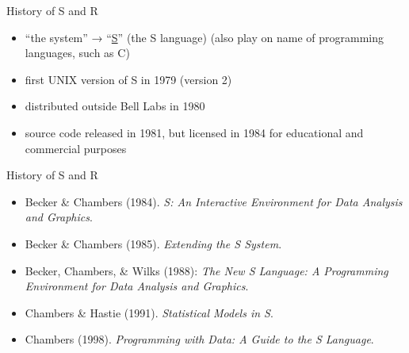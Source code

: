 \documentclass[t,12pt]{beamer}
\begin{document}

\begin{frame}{History of S and R}

\begin{itemize}
   \item ``the system'' → ``\href{http://en.wikipedia.org/wiki/S_(programming_language)}{S}'' (the S language) (also play on name of programming languages, such as C)
   \item first UNIX version of S in 1979 (version 2)
   \item distributed outside Bell Labs in 1980
   \item source code released in 1981, but licensed in 1984 for educational and commercial purposes
\end{itemize}

\end{frame}


\begin{frame}{History of S and R}

\begin{itemize}
   \item Becker \& Chambers (1984). \textit{S: An Interactive Environment for Data Analysis and Graphics}.
   \item Becker \& Chambers (1985). \textit{Extending the S System}.
   \item Becker, Chambers, \& Wilks (1988): \textit{The New S Language: A Programming Environment for Data Analysis and Graphics}.
   \item Chambers \& Hastie (1991). \textit{Statistical Models in S}.
   \item Chambers (1998). \textit{Programming with Data: A Guide to the S Language}.
\end{itemize}

\end{frame}

\end{document}
